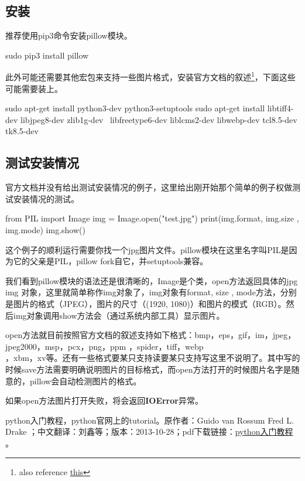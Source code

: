 \documentclass[12pt,oneside]{book}
\begin{document}
\begin{common-format}
\section{安装}
推荐使用pip3命令安装pillow模块。

\begin{tcbbash}[]
sudo pip3 install pillow
\end{tcbbash}

此外可能还需要其他宏包来支持一些图片格式，安装官方文档的叙述\footnote{also reference \href{http://askubuntu.com/questions/427358/install-pillow-for-python-3}{this}}，下面这些可能需要装上。
\begin{tcbbash}[]
sudo apt-get install python3-dev python3-setuptools
sudo apt-get install libtiff4-dev libjpeg8-dev zlib1g-dev \
    libfreetype6-dev liblcms2-dev libwebp-dev tcl8.5-dev tk8.5-dev
\end{tcbbash}


\subsection{测试安装情况}
官方文档并没有给出测试安装情况的例子，这里给出刚开始那个简单的例子权做测试安装情况的测试。

\begin{tcbpython}[]
from PIL import Image
img = Image.open("test.jpg")
print(img.format, img.size , img.mode)
img.show()
\end{tcbpython}

这个例子的顺利运行需要你找一个jpg图片文件。pillow模块在这里名字叫PIL是因为它的父亲是PIL，pillow fork自它，并setuptools兼容。

我们看到pillow模块的语法还是很清晰的，Image是个类，open方法返回具体的jpg img 对象，这里就简单称作img对象了，img对象有format, size , mode方法，分别是图片的格式（JPEG），图片的尺寸（(1920, 1080)）和图片的模式（RGB）。然后img对象调用show方法会（通过系统内部工具）显示图片。

open方法就目前按照官方文档的叙述支持如下格式：bmp，eps，gif，im，jpeg，jpeg2000，msp，pcx，png，ppm ，spider，tiff，webp\\ ，xbm，xv等。还有一些格式要某只支持读要某只支持写这里不说明了。其中写的时候save方法需要明确说明图片的目标格式，而open方法打开的时候图片名字是随意的，pillow会自动检测图片的格式。

如果open方法图片打开失败，将会返回\textbf{IOError}异常。





\begin{thebibliography}{9}
 python入门教程，python官网上的tutorial。原作者：Guido van Rossum  Fred L. Drake ；中文翻译：刘鑫等；版本：2013-10-28；pdf下载链接：\href{https://drive.google.com/open?id=0ByWxOeitx54PSW40bU5zNVhuMlU&authuser=0}{python入门教程}  。


\end{thebibliography}
\end{common-format}
\end{document}
